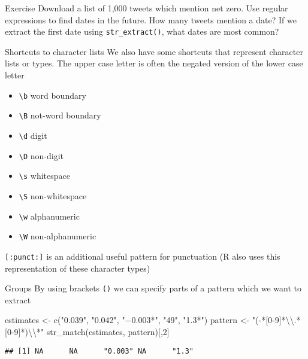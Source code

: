 \documentclass[
  10pt,
  ignorenonframetext,
  aspectratio=169]{beamer}
\newenvironment{Shaded}{\begin{snugshade}}{\end{snugshade}}
\newcommand{\DecValTok}[1]{\textcolor[rgb]{0.86,0.86,0.80}{#1}}
\newcommand{\FunctionTok}[1]{\textcolor[rgb]{0.94,0.94,0.56}{#1}}
\newcommand{\NormalTok}[1]{\textcolor[rgb]{0.80,0.80,0.80}{#1}}
\newcommand{\OtherTok}[1]{\textcolor[rgb]{0.94,0.94,0.56}{#1}}
\newcommand{\SpecialCharTok}[1]{\textcolor[rgb]{0.86,0.64,0.64}{#1}}
\newcommand{\StringTok}[1]{\textcolor[rgb]{0.80,0.58,0.58}{#1}}
\providecommand{\tightlist}{%
  \setlength{\itemsep}{0pt}\setlength{\parskip}{0pt}}
\begin{document}
\begin{frame}[fragile]{Exercise}
\protect\hypertarget{exercise}{}
Download a list of 1,000 tweets which mention net zero. Use regular
expressions to find dates in the future. How many tweets mention a date?
If we extract the first date using \texttt{str\_extract()}, what dates
are most common?
\end{frame}

\begin{frame}[fragile]{Shortcuts to character lists}
\protect\hypertarget{shortcuts-to-character-lists}{}
We also have some shortcuts that represent character lists or types. The
upper case letter is often the negated version of the lower case letter

\begin{itemize}
\tightlist
\item
  \texttt{\textbackslash{}b} word boundary
\item
  \texttt{\textbackslash{}B} not-word boundary
\item
  \texttt{\textbackslash{}d} digit
\item
  \texttt{\textbackslash{}D} non-digit
\item
  \texttt{\textbackslash{}s} whitespace
\item
  \texttt{\textbackslash{}S} non-whitespace
\item
  \texttt{\textbackslash{}w} alphanumeric
\item
  \texttt{\textbackslash{}W} non-alphanumeric
\end{itemize}

\texttt{{[}:punct:{]}} is an additional useful pattern for punctuation
(R also uses this representation of these character types)
\end{frame}

\begin{frame}[fragile]{Groups}
\protect\hypertarget{groups}{}
By using brackets \texttt{()} we can specify parts of a pattern which we
want to extract

\begin{Shaded}
\begin{Highlighting}[]
\NormalTok{estimates }\OtherTok{\textless{}{-}} \FunctionTok{c}\NormalTok{(}\StringTok{"0.039"}\NormalTok{, }\StringTok{"0.042"}\NormalTok{, }\StringTok{"−0.003*"}\NormalTok{, }\StringTok{"49"}\NormalTok{, }\StringTok{"1.3*"}\NormalTok{)}
\NormalTok{pattern }\OtherTok{\textless{}{-}} \StringTok{"({-}*[0{-}9]*}\SpecialCharTok{\textbackslash{}\textbackslash{}}\StringTok{.*[0{-}9]*)}\SpecialCharTok{\textbackslash{}\textbackslash{}}\StringTok{*"}
\FunctionTok{str\_match}\NormalTok{(estimates, pattern)[,}\DecValTok{2}\NormalTok{]}
\end{Highlighting}
\end{Shaded}

\begin{verbatim}
## [1] NA      NA      "0.003" NA      "1.3"
\end{verbatim}
\end{frame}
\end{document}
